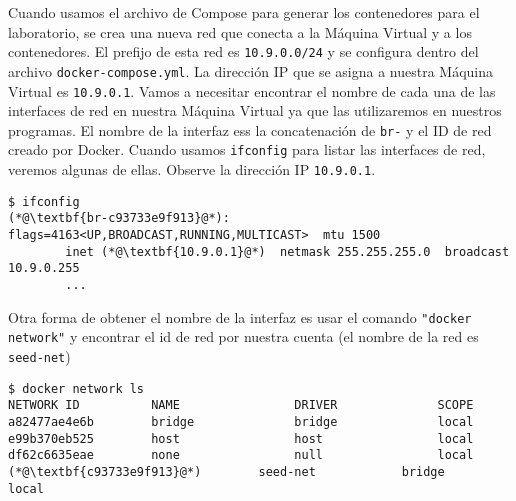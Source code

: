 Cuando usamos el archivo de Compose para generar los contenedores para el laboratorio, se crea una nueva red que conecta a la Máquina Virtual y a los contenedores. El prefijo de esta red es \texttt{10.9.0.0/24} y se configura dentro del archivo \texttt{docker-compose.yml}. La dirección IP que se asigna a nuestra Máquina Virtual es \texttt{10.9.0.1}. Vamos a necesitar encontrar el nombre de cada una de las interfaces de red en nuestra Máquina Virtual ya que las utilizaremos en nuestros programas. El nombre de la interfaz ess la concatenación de \texttt{br-} y el ID de red creado por Docker.
Cuando usamos \texttt{ifconfig} para listar las interfaces de red, veremos algunas de ellas. Observe la dirección IP \texttt{10.9.0.1}.


\begin{lstlisting}
$ ifconfig
(*@\textbf{br-c93733e9f913}@*): flags=4163<UP,BROADCAST,RUNNING,MULTICAST>  mtu 1500
        inet (*@\textbf{10.9.0.1}@*)  netmask 255.255.255.0  broadcast 10.9.0.255
        ...
\end{lstlisting}

Otra forma de obtener el nombre de la interfaz es usar el comando \texttt{"docker network"} y encontrar el id de red por nuestra cuenta (el nombre de la red es \texttt{seed-net})

\begin{lstlisting}
$ docker network ls
NETWORK ID          NAME                DRIVER              SCOPE
a82477ae4e6b        bridge              bridge              local
e99b370eb525        host                host                local
df62c6635eae        none                null                local
(*@\textbf{c93733e9f913}@*)        seed-net            bridge              local
\end{lstlisting}


